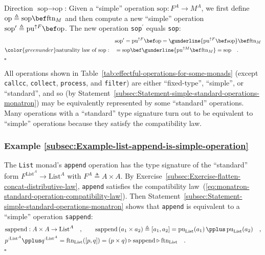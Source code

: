 Direction $\text{sop}\rightarrow\text{op}$: Given a \textsf{``}simple\textsf{''}
operation $\text{sop}:F^{A}\rightarrow M^{A}$, we first define $\text{op}\triangleq\text{sop}\bef\text{ftn}_{M}$
and then compute a new \textsf{``}simple\textsf{''} operation $\text{sop}^{\prime}\triangleq\text{pu}^{\uparrow F}\bef\text{op}$.
The new operation \lstinline!sop!$^{\prime}$ equals \lstinline!sop!:
\begin{align*}
 & \text{sop}^{\prime}=\text{pu}^{\uparrow F}\bef\text{op}=\gunderline{\text{pu}^{\uparrow F}\bef\text{sop}}\bef\text{ftn}_{M}\\
{\color{greenunder}\text{naturality law of }\text{sop}:}\quad & =\text{sop}\bef\gunderline{\text{pu}^{\uparrow M}\bef\text{ftn}_{M}}=\text{sop}\quad.
\end{align*}
$\square$

All operations shown in Table~\ref{tab:effectful-operations-for-some-monads}
(except \lstinline!callcc!, \lstinline!collect!, \lstinline!process!,
and \lstinline!filter!) are either \textsf{``}fixed-type\textsf{''}, \textsf{``}simple\textsf{''},
or \textsf{``}standard\textsf{''}, and so (by Statement~\ref{subsec:Statement-simple-standard-operations-monatron})
may be equivalently represented by some \textsf{``}standard\textsf{''} operations.
Many operations with a \textsf{``}standard\textsf{''} type signature turn out to be
equivalent to \textsf{``}simple\textsf{''} operations because they satisfy the compatibility
law. 

\subsubsection{Example \label{subsec:Example-list-append-is-simple-operation}\ref{subsec:Example-list-append-is-simple-operation}}

The \lstinline!List! monad\textsf{'}s \lstinline!append! operation has the
type signature of the \textsf{``}standard\textsf{''} form $F^{\text{List}^{A}}\rightarrow\text{List}^{A}$
with $F^{A}\triangleq A\times A$. By Exercise~\ref{subsec:Exercise-flatten-concat-distributive-law},
\lstinline!append! satisfies the compatibility law~(\ref{eq:monatron-standard-operation-compatibility-law}).
Then Statement~\ref{subsec:Statement-simple-standard-operations-monatron}
shows that \lstinline!append! is equivalent to a \textsf{``}simple\textsf{''} operation
\lstinline!sappend!:
\begin{align*}
 & \text{sappend}:A\times A\rightarrow\text{List}^{A}\quad,\quad\quad\text{sappend}\left(a_{1}\times a_{2}\right)\triangleq[a_{1},a_{2}]=\text{pu}_{\text{List}}(a_{1})\,\pplus\,\text{pu}_{\text{List}}(a_{2})\quad,\\
 & p^{:\text{List}^{A}}\pplus q^{:\text{List}^{A}}=\text{ftn}_{\text{List}}([p,q])=\left(p\times q\right)\triangleright\text{sappend}\triangleright\text{ftn}_{\text{List}}\quad.
\end{align*}
$\square$

